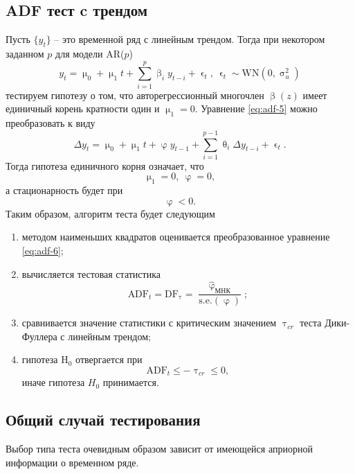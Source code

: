 \documentclass[a4paper, 14pt]{extreport}
\numberwithin{equation}{section}
\renewcommand{\leq}{\leqslant}
\renewcommand{\beta}{\upbeta}
\renewcommand{\epsilon}{\upvarepsilon}
\renewcommand{\theta}{\uptheta}
\renewcommand{\mu}{\upmu}
\renewcommand{\sigma}{\upsigma}
\renewcommand{\tau}{\uptau}
\renewcommand{\varphi}{\upvarphi}
\numberwithin{equation}{section}
\begin{document}
	\subsection{ADF тест c трендом}
	Пусть $\{y_t\}$ -- это временной ряд с линейным трендом.
	Тогда при некотором заданном $p$ для модели AR($p$)
	\begin{equation}\label{eq:adf-5}
		y_t=\mu_0+\mu_1 t+\sum_{i=1}^{p}\beta_i y_{t-i} + \epsilon_t,\ \epsilon_t\sim \text{WN}(0,\sigma^2_u)
	\end{equation}
	тестируем гипотезу о том, что авторегрессионный многочлен $\beta(z)$ имеет единичный корень кратности один и $\mu_1=0$.
	Уравнение \eqref{eq:adf-5} можно преобразовать к виду
	\begin{equation}\label{eq:adf-6}
		\Delta y_t=\mu_0+\mu_1 t+\varphi y_{t-1}+\sum_{i=1}^{p-1}\theta_i\Delta y_{t-i}+\epsilon_t.
	\end{equation}
	Тогда гипотеза единичного корня означает, что $$\mu_1=0,\ \varphi=0,$$ а стационарность будет при $$\varphi< 0.$$
	Таким образом, алгоритм теста будет следующим
	\begin{enumerate}
		\item методом наименьших квадратов оценивается преобразованное уравнение \eqref{eq:adf-6};
		\item вычисляется тестовая статистика
		\begin{equation}
			\text{ADF}_t=\text{DF}_\tau=\dfrac{\widehat{\varphi}_{\text{МНК}}}{\text{s.e.}(\varphi)};
		\end{equation}
		\item сравнивается значение статистики с критическим значением $\tau_{cr}$ теста Дики-Фуллера с линейным трендом;
		\item гипотеза $\text{H}_0$ отвергается при
		\begin{equation}
			\text{ADF}_t\leq-\tau_{cr}\leq 0,
			\end{equation}
		иначе гипотеза $H_0$ принимается.
	\end{enumerate}
	
	\subsection{Общий случай тестирования}
	Выбор типа теста очевидным образом зависит от имеющейся априорной информации о временном ряде.
	
\end{document}
